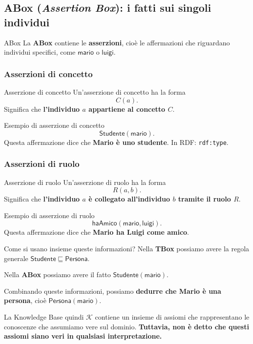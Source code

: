 \subsection{ABox (\emph{Assertion Box}): i fatti sui singoli individui}

\begin{definition}{ABox}
    La \textbf{ABox} contiene le \textbf{asserzioni}, cioè le affermazioni
    che riguardano individui specifici, come \(\mathsf{mario}\) o \(\mathsf{luigi}\).
\end{definition}

\subsubsection{Asserzioni di concetto}

\begin{definition}{Asserzione di concetto}
    Un'asserzione di concetto ha la forma
    \[
        C(a).
    \]
    Significa che \textbf{l'individuo \(a\) appartiene al concetto \(C\)}.
\end{definition}
\begin{observation}{Esempio di asserzione di concetto}
    \[
        \mathsf{Studente}(\mathsf{mario}).
    \]
    Questa affermazione dice che \textbf{Mario è uno studente}.
    In RDF: \texttt{rdf:type}.
\end{observation}

\subsubsection{Asserzioni di ruolo}

\begin{definition}{Asserzione di ruolo}
    Un'asserzione di ruolo ha la forma
    \[
        R(a,b).
    \]
    Significa che \textbf{l'individuo \(a\) è collegato all'individuo \(b\)
    tramite il ruolo \(R\)}.
\end{definition}
\begin{observation}{Esempio di asserzione di ruolo}
    \[
        \mathsf{haAmico}(\mathsf{mario},\mathsf{luigi}).
    \]
    Questa affermazione dice che \textbf{Mario ha Luigi come amico}.
\end{observation}

\begin{observation}{Come si usano insieme queste informazioni?}
    Nella \textbf{TBox} possiamo avere la regola generale
    \(\mathsf{Studente}\sqsubseteq\mathsf{Persona}\).

    Nella \textbf{ABox} possiamo avere il fatto \(\mathsf{Studente}(\mathsf{mario})\).

    Combinando queste informazioni, possiamo \textbf{dedurre che Mario è
    una persona}, cioè \(\mathsf{Persona}(\mathsf{mario})\).
\end{observation}
La Knowledge Base quindi \(\mathcal K\) contiene un insieme di assiomi che rappresentano le conoscenze che assumiamo vere sul dominio.
\textbf{Tuttavia, non è detto che questi assiomi siano veri in qualsiasi interpretazione.}


